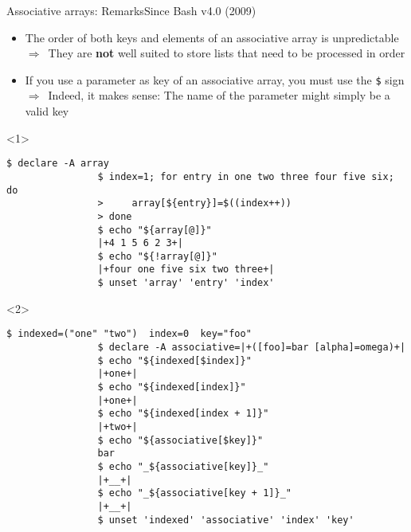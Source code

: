 \begin{frame}[fragile]{Associative arrays: Remarks}{Since Bash v4.0 (2009)}
    \vspace{-2mm}
    \begin{overlayarea}{\textwidth}{0.7\textheight}
        \begin{itemize}
            \item \alert{The order of both keys and elements} of an associative array is \alert{unpredictable}\\
                  $\Rightarrow\,$ They are \textbf{not} well suited to store lists that need to be processed in order
            \item If you use a parameter as key of an associative array, \alert{you must use the \texttt{\$} sign}\\
                  $\Rightarrow\,$ Indeed, it makes sense: The name of the parameter might simply be a valid key
        \end{itemize}
        \begin{onlyenv}<1>
            \begin{lstlisting}[style=MyBash]
                $ declare -A array
                $ index=1; for entry in one two three four five six; do
                >     array[${entry}]=$((index++))
                > done
                $ echo "${array[@]}"
                |+4 1 5 6 2 3+|
                $ echo "${!array[@]}"
                |+four one five six two three+|
                $ unset 'array' 'entry' 'index'
            \end{lstlisting}
        \end{onlyenv}
        \begin{onlyenv}<2>
            \begin{lstlisting}[style=MyBash, firstnumber=10, emph={[7]associative, indexed}]
                $ indexed=("one" "two")  index=0  key="foo"
                $ declare -A associative=|+([foo]=bar [alpha]=omega)+|
                $ echo "${indexed[$index]}"
                |+one+|
                $ echo "${indexed[index]}"
                |+one+|
                $ echo "${indexed[index + 1]}"
                |+two+|
                $ echo "${associative[$key]}"
                bar
                $ echo "_${associative[key]}_"
                |+__+|
                $ echo "_${associative[key + 1]}_"
                |+__+|
                $ unset 'indexed' 'associative' 'index' 'key'
            \end{lstlisting}
        \end{onlyenv}
    \end{overlayarea}
\end{frame}
